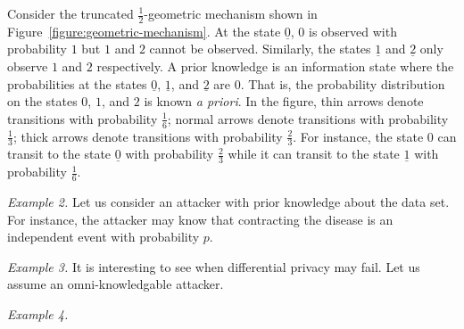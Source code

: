 Consider the truncated $\frac{1}{2}$-geometric mechanism shown in
Figure~\ref{figure:geometric-mechanism}. At the state $\underline{0}$,
$0$ is observed with probability $1$ but $1$ and $2$ cannot be
observed. Similarly, the states $\underline{1}$ and $\underline{2}$
only observe $1$ and $2$ respectively. A prior knowledge is an
information state where the probabilities at the states $\underline{0}$,
$\underline{1}$, and $\underline{2}$ are $0$. That is, the probability
distribution on the states $0$, $1$, and $2$ is known \emph{a priori}.
In the figure, thin arrows denote transitions with probability
$\frac{1}{6}$; normal arrows denote transitions with probability
$\frac{1}{3}$; thick arrows denote transitions with probability
$\frac{2}{3}$. For instance, the state $0$ can transit to the state
$\underline{0}$ with probability $\frac{2}{3}$ while it can transit to
the state $\underline{1}$ with probability $\frac{1}{6}$.



\noindent
\textit{Example 2.}
Let us consider an attacker with prior knowledge about the data
set. For instance, the attacker may know that contracting the disease
is an independent event with probability $p$.



\noindent
\textit{Example 3.}
It is interesting to see when differential privacy may fail. Let us
assume an omni-knowledgable attacker.



\noindent
\textit{Example 4.}
